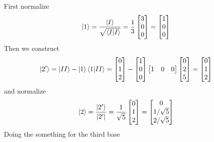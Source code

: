 \documentclass[../../../main.tex]{subfiles}
\begin{document}
First normalize
\begin{equation*}
	\ket{1}=\frac{\ket{I}}{\sqrt{\braket{I|I}}}=\frac{1}{3}\begin{bmatrix}
		3 \\0\\0
	\end{bmatrix}=\begin{bmatrix}
		1 \\0\\0
	\end{bmatrix}
\end{equation*}
Then we construct
\begin{equation*}
	\ket{2'}=\ket{II}-\ket{1}\braket{1|II}=\begin{bmatrix}
		0 \\1\\2
	\end{bmatrix}
	-
	\begin{bmatrix}
		1 \\0\\0
	\end{bmatrix}
	\begin{bmatrix}
		1 & 0 & 0
	\end{bmatrix}
	\begin{bmatrix}
		0 \\2\\5
	\end{bmatrix}
	=
	\begin{bmatrix}
		0 \\1\\2
	\end{bmatrix}
\end{equation*}
and normalize
\begin{equation*}
	\ket{2}=\frac{\ket{2'}}{|2'|}=\frac{1}{\sqrt{5}}\begin{bmatrix}
		0 \\1\\2
	\end{bmatrix}=
	\begin{bmatrix}
		0 \\1/\sqrt{5}\\2/\sqrt{5}
	\end{bmatrix}
\end{equation*}
Doing the something for the third base
\end{document}
